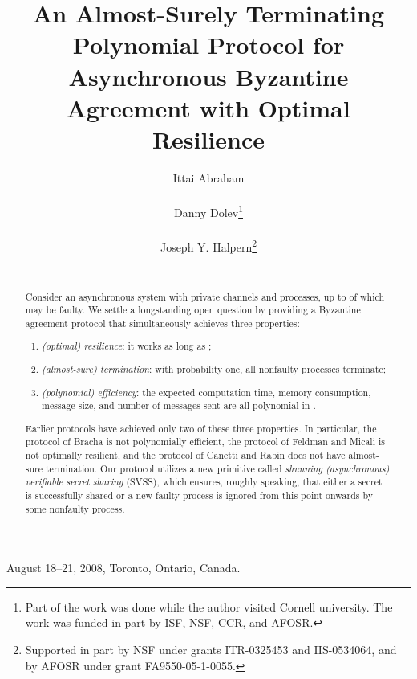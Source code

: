 \documentclass{sig-alternate}
\begin{document}
 {August 18--21, 2008, Toronto, Ontario, Canada.}




\title{An Almost-Surely Terminating Polynomial Protocol for
Asynchronous Byzantine Agreement with Optimal Resilience}





\author{
\alignauthor Ittai Abraham\\
 \\
\alignauthor Danny Dolev\thanks{Part of the work was done
while the author visited Cornell university. The work was
funded in part by ISF, NSF, CCR, and AFOSR.} \\
 \\
\alignauthor Joseph Y. Halpern\thanks{
Supported in part by NSF under grants ITR-0325453 and
IIS-0534064,  and by AFOSR under grant FA9550-05-1-0055.
} \\
 \\
 }

\maketitle
\begin{abstract}
Consider an asynchronous system with private channels and  processes,
up to  of which may be faulty.  We settle a longstanding open
question by providing a Byzantine agreement protocol that simultaneously
achieves three properties:
\begin{enumerate}
\item \emph{(optimal) resilience}: it works as long as ;
\item \emph{(almost-sure) termination}: with probability one, all
nonfaulty processes terminate;
\item \emph{(polynomial) efficiency}: the expected computation time,
  memory consumption, message size, and number of messages sent are all
  polynomial in .
\end{enumerate}
Earlier protocols have achieved only two of these three
properties.  In particular, the protocol of Bracha is not polynomially
efficient, the protocol of Feldman and Micali is not optimally
resilient, and the protocol of Canetti and Rabin does not have
almost-sure termination. Our protocol utilizes a new primitive called
\emph{shunning (asynchronous) verifiable secret sharing}
(SVSS), which ensures,
roughly speaking, that either a secret is successfully shared or a new
faulty process is ignored from this point onwards
by some nonfaulty process.
\end{abstract}
\end{document}
